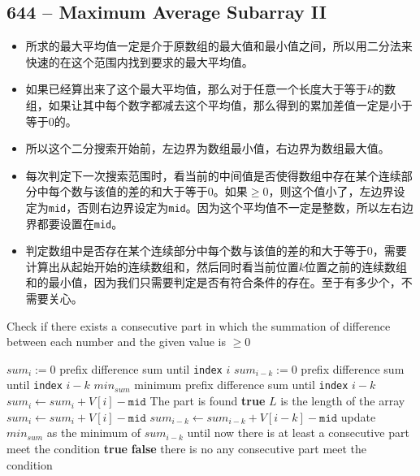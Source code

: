 \documentclass[a4paper,12pt]{article}
\begin{document}
\subsection{644 -- Maximum Average Subarray II}
\begin{CJK*}{UTF8}{gbsn}
\begin{itemize}
\item 所求的最大平均值一定是介于原数组的最大值和最小值之间，所以用二分法来快速的在这个范围内找到要求的最大平均值。
\item 如果已经算出来了这个最大平均值，那么对于任意一个长度大于等于$k$的数组，如果让其中每个数字都减去这个平均值，那么得到的累加差值一定是小于等于$0$的。
\item 所以这个二分搜索开始前，左边界为数组最小值，右边界为数组最大值。
\item 每次判定下一次搜索范围时，看当前的中间值是否使得数组中存在某个连续部分中每个数与该值的差的和大于等于$0$。如果$\geq 0$，则这个值小了，左边界设定为\texttt{mid}，否则右边界设定为\texttt{mid}。因为这个平均值不一定是整数，所以左右边界都要设置在\texttt{mid}。
\item 判定数组中是否存在某个连续部分中每个数与该值的差的和大于等于$0$，需要计算出从起始开始的连续数组和，然后同时看当前位置$k$位置之前的连续数组和的最小值，因为我们只需要判定是否有符合条件的存在。至于有多少个，不需要关心。
\end{itemize}
\clearpage
\end{CJK*}
\setcounter{algorithm}{0}
\begin{algorithm}[H]
\caption{Check if there exists a consecutive part  in which the summation of difference between each number and the given value is $\geq 0$}
\label{BinCheck}
\begin{algorithmic}
\Statex
{}
\State $sum_{i} := 0$ \Comment prefix difference sum until \texttt{index} $i$
\State $sum_{i-k} := 0$ \Comment prefix difference sum until \texttt{index} $i-k$
\State $min_{sum}$ \Comment minimum prefix difference sum until \texttt{index} $i-k$
\State $sum_{i}\gets sum_{i} + V[i] - \mathtt{mid} $
\EndFor
{} \Comment The part is found
\State \Return \textbf{true}
\EndIf
{} \Comment $L$ is the length of the array
\State $sum_{i}\gets sum_{i} + V[i] - \mathtt{mid}$
\State $sum_{i-k} \gets sum_{i-k} + V[i-k] - \mathtt{mid}$
\State update $min_{sum}$ as the minimum of $sum_{i-k}$ until now
  \Comment there is at least a consecutive part meet the condition
\State \Return \textbf{true}
\EndIf
\EndFor
\State \Return \textbf{false} \Comment there is no any consecutive part meet the condition
\EndProcedure
\Statex
\end{algorithmic}
\end{algorithm}
\end{document}
